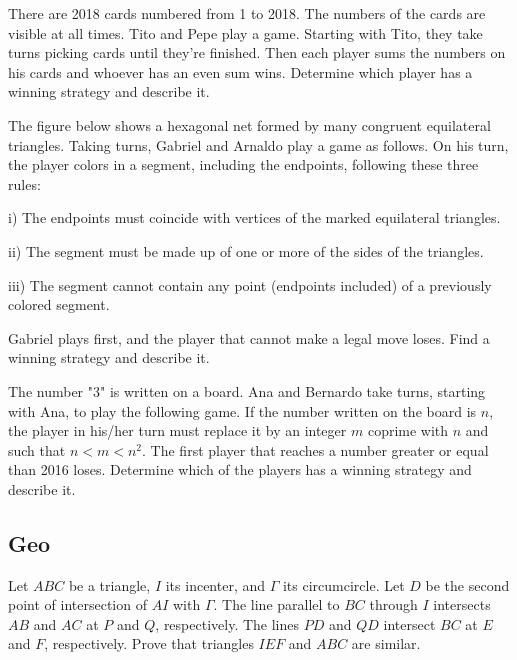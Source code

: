 \documentclass[11pt]{scrartcl}
\begin{document}
\begin{problem}[Centro 2018/1]
	There are 2018 cards numbered from 1 to 2018. The numbers of the cards are visible at all times. Tito and Pepe play a game. Starting with Tito, they take turns picking cards until they're finished. Then each player sums the numbers on his cards and whoever has an even sum wins. Determine which player has a winning strategy and describe it.
\end{problem}

\begin{problem}[Centro 2017/1]
The figure below shows a hexagonal net formed by many congruent equilateral triangles. Taking turns, Gabriel and Arnaldo play a game as follows. On his turn, the player colors in a segment, including the endpoints, following these three rules:

i) The endpoints must coincide with vertices of the marked equilateral triangles.

ii) The segment must be made up of one or more of the sides of the triangles.

iii) The segment cannot contain any point (endpoints included) of a previously colored segment.

Gabriel plays first, and the player that cannot make a legal move loses. Find a winning strategy and describe it.
\end{problem} 

\begin{problem}[Centro 2016/4]
The number "3" is written on a board. Ana and Bernardo take turns, starting with Ana, to play the following game. If the number written on the board is $n$, the player in his/her turn must replace it by an integer $m$ coprime with $n$ and such that $n<m<n^2$. The first player that reaches a number greater or equal than 2016 loses. Determine which of the players has a winning strategy and describe it.
\end{problem}


\subsection{Geo}

\begin{problem} [Centro 2024/4]
Let $ABC$ be a triangle, $I$ its incenter, and $\Gamma$ its circumcircle. Let $D$ be the second point of intersection of $AI$ with $\Gamma$. The line parallel to $BC$ through $I$ intersects $AB$ and $AC$ at $P$ and $Q$, respectively. The lines $PD$ and $QD$ intersect $BC$ at $E$ and $F$, respectively. Prove that triangles $IEF$ and $ABC$ are similar.
\end{problem}
\end{document}
